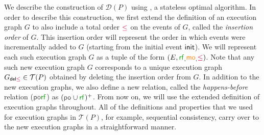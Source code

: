 We describe the construction of $\mathcal{D}(P)$ using \trust\cite{trust}, a stateless optimal \dpor algorithm. In order to describe this construction, we first extend the definition of an execution graph $G$ to also include a total order $\textcolor{purple}\leq$ on the events of $G$, called the \emph{insertion order} of $G$. This insertion order will represent the order in which events were incrementally added to $G$ (starting from the initial event $\mathsf{init}$). We will represent each such execution graph $G$ as a tuple of the form $(E,\rf,\mo,\inord)$. Note that any such new execution graph $G$ corresponds to a unique execution graph $G_{\textsf{del} \textcolor{purple}\leq} \in \mathcal{T}(P)$ obtained by deleting the insertion order from $G$.
In addition to the new execution graphs, we also define a new relation, called the \emph{happens-before} relation  ($\porf{}$) as $(\po{} \cup \rf{})^+$.
From now on, we will use the extended definition of execution graphs throughout.
All of the definitions and properties that we used for execution graphs in $\mathcal{T}(P)$, for example, sequential consistency, carry over to the new execution graphs in a straightforward manner. 


